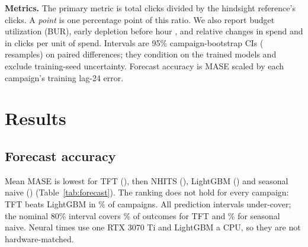 \documentclass[sigconf,nonacm]{acmart}
\begin{document}
\textbf{Metrics.} The primary metric is total clicks divided by the hindsight
reference's clicks. A \emph{point} is one percentage point of this ratio. We
also report budget utilization (BUR), early depletion before hour
, and relative changes in spend and in clicks per unit of
spend. Intervals are 95\% campaign-bootstrap CIs (
resamples) on paired differences; they condition on the trained models and
exclude training-seed uncertainty. Forecast accuracy is MASE
\cite{hyndman2006another} scaled by each campaign's training lag-24 error.

\begin{table}[t]
  \caption{Click ratios of the original four-forecaster study, pooled over episodes and seeds; bold marks the best non-reference value. Operational metrics at $\rho=0.5$.}
  \label{tab:pacing}
  \small
  
\end{table}

\section{Results}

\begin{table}[tb]
  \caption{Original four forecasters: mean test accuracy ($\pm$ training-seed SD). MASE$_h$ is MASE at step $h$; sPL$_{0.9}$ is scaled pinball loss; Cov.\ is 80\% interval coverage; time includes fitting and forecasting.}
  \label{tab:forecast}
  \small\setlength{\tabcolsep}{3pt}
  \resizebox{\linewidth}{!}{}
\end{table}

\subsection{Forecast accuracy}
Mean MASE is lowest for TFT (), then NHITS
(), LightGBM () and seasonal naive
() (Table~\ref{tab:forecast}). The ranking does not hold
for every campaign: TFT beats LightGBM in \% of
campaigns. All prediction intervals under-cover; the nominal 80\% interval
covers \% of outcomes for TFT and \% for
seasonal naive. Neural times use one RTX 3070 Ti and LightGBM a CPU, so they
are not hardware-matched.
\end{document}
